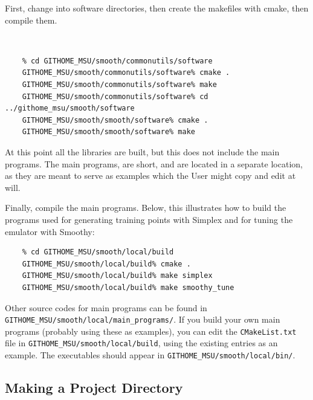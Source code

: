 \documentclass[main.tex]{subfiles}
\begin{document}
First, change into software directories, then create the makefiles with cmake, then compile them.\\
\vspace{-20pt}
{\tt 
\begin{verbatim}
    % cd GITHOME_MSU/smooth/commonutils/software
    GITHOME_MSU/smooth/commonutils/software% cmake .
    GITHOME_MSU/smooth/commonutils/software% make
    GITHOME_MSU/smooth/commonutils/software% cd ../githome_msu/smooth/software
    GITHOME_MSU/smooth/smooth/software% cmake .
    GITHOME_MSU/smooth/smooth/software% make
\end{verbatim}
At this point all the libraries are built, but this does not include the main programs. The main programs, are short, and are located in a separate location, as they are meant to serve as examples which the User might copy and edit at will.

Finally, compile the main programs. Below, this illustrates how to build the programs used for generating training points with Simplex and for tuning the emulator with Smoothy:
\begin{verbatim}
    % cd GITHOME_MSU/smooth/local/build
    GITHOME_MSU/smooth/local/build% cmake .
    GITHOME_MSU/smooth/local/build% make simplex
    GITHOME_MSU/smooth/local/build% make smoothy_tune
\end{verbatim}
}
Other source codes for main programs can be found in {\tt GITHOME\_MSU/smooth/local/main\_programs/}. If you build your own main programs (probably using these as examples), you can edit the {\tt CMakeList.txt} file in {\tt GITHOME\_MSU/smooth/local/build}, using the existing entries as an example. The executables should appear in {\tt GITHOME\_MSU/smooth/local/bin/}. 

\subsection{Making a Project Directory}
\end{document}
